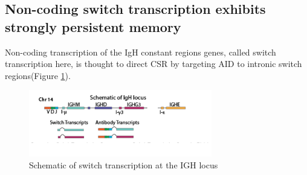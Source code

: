 \subsection{Non-coding switch transcription exhibits strongly persistent memory}

Non-coding transcription of the IgH constant regions genes, called switch transcription here, is thought to direct CSR by targeting AID to intronic switch regions(Figure \ref{fig:paper2_IGH_schematic})\cite{stavnezer_igh_2014}. 

\begin{figure}[htb!]
\centering
\includegraphics[width=8cm, keepaspectratio]{figs/prelim_InVitro/IGH_schematic.pdf}
\caption[Schematic of switch (germline) transcription at the IGH locus]{Schematic of switch transcription at the IGH locus}
\label{fig:paper2_IGH_schematic}
\end{figure}


